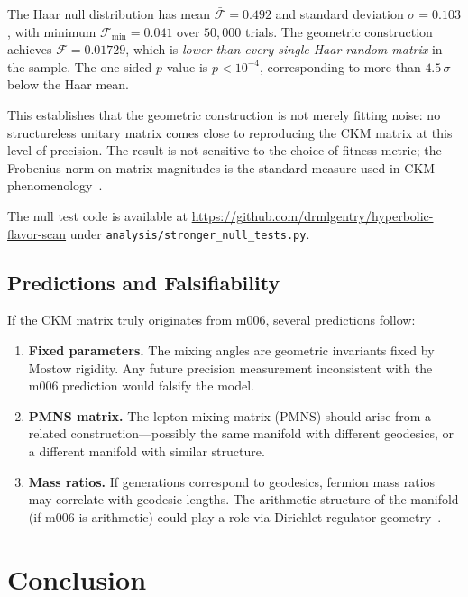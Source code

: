 \documentclass[12pt,prd,superscriptaddress,nofootinbib]{revtex4-2}
\begin{document}
The Haar null distribution has mean $\bar{\mathcal{F}} = 0.492$ and
standard deviation $\sigma = 0.103$, with minimum $\mathcal{F}_{\min}
= 0.041$ over $50{,}000$ trials. The geometric construction achieves
$\mathcal{F} = 0.01729$, which is \emph{lower than every single
Haar-random matrix} in the sample. The one-sided $p$-value is
$p < 10^{-4}$, corresponding to more than $4.5\,\sigma$ below the
Haar mean.

This establishes that the geometric construction is not merely
fitting noise: no structureless unitary matrix comes close to
reproducing the CKM matrix at this level of precision. The result
is not sensitive to the choice of fitness metric; the Frobenius norm
on matrix magnitudes is the standard measure used in CKM
phenomenology~\cite{PDG2024}.

The null test code is available at
\url{https://github.com/drmlgentry/hyperbolic-flavor-scan} under
\texttt{analysis/stronger\_null\_tests.py}.

\subsection{Predictions and Falsifiability}
\label{subsec:predictions}

If the CKM matrix truly originates from m006, several predictions follow:

\begin{enumerate}
\item \textbf{Fixed parameters.} The mixing angles are geometric 
invariants fixed by Mostow rigidity. Any future precision 
measurement inconsistent with the m006 prediction would falsify the 
model.

\item \textbf{PMNS matrix.} The lepton mixing matrix (PMNS) should 
arise from a related construction---possibly the same manifold with 
different geodesics, or a different manifold with similar structure.

\item \textbf{Mass ratios.} If generations correspond to geodesics, 
fermion mass ratios may correlate with geodesic lengths. The arithmetic 
structure of the manifold (if m006 is arithmetic) could play a role 
via Dirichlet regulator geometry~\cite{Neukirch1999}.
\end{enumerate}

\section{Conclusion}
\label{sec:conclusion}
\end{document}
